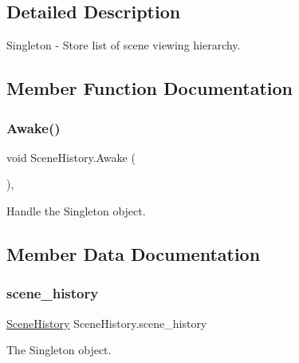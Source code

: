\subsection{Detailed Description}
Singleton -\/ Store list of scene viewing hierarchy. 

\subsection{Member Function Documentation}
\mbox{\label{class_scene_history_a514f50fbc863e0b0e3b93dbf88a40703}} 
\subsubsection{\texorpdfstring{Awake()}{Awake()}}
{\footnotesize\ttfamily void Scene\+History.\+Awake (\begin{DoxyParamCaption}{ }\end{DoxyParamCaption})\hspace{0.3cm}{\ttfamily [inline]}, {\ttfamily [private]}}



Handle the Singleton object. 



\subsection{Member Data Documentation}
\mbox{\label{class_scene_history_a66d1fc693a99eb7055349244fa233868}} 
\subsubsection{\texorpdfstring{scene\_history}{scene\_history}}
{\footnotesize\ttfamily \mbox{\hyperlink{class_scene_history}{Scene\+History}} Scene\+History.\+scene\+\_\+history\hspace{0.3cm}{\ttfamily [static]}}



The Singleton object. 

\mbox{\label{class_scene_history_a2795917d2bfcff8b698453e9ea474efc}} 

